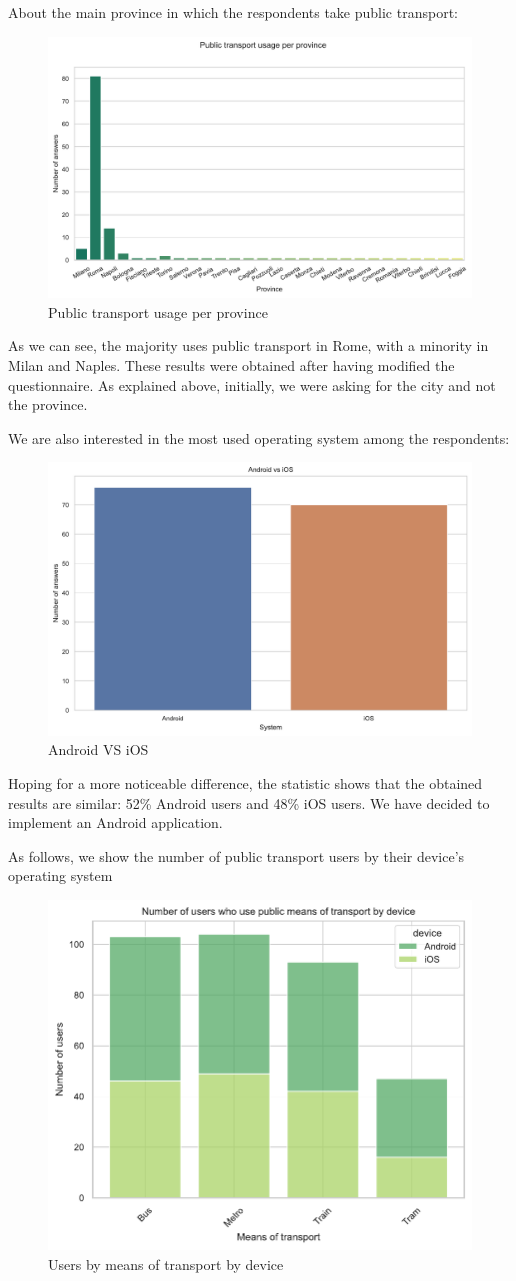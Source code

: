 \documentclass[a4paper, 11pt]{report}
\begin{document}
About the main province in which the respondents take public transport:
\begin{figure}[H]
	\centering
	\includegraphics[width=.8\textwidth]{img/analysis/public_transport_usage_per_province.pdf}
	\caption{Public transport usage per province}
\end{figure}
As we can see, the majority uses public transport in Rome, with a minority in Milan and Naples. These results were obtained after having modified
the questionnaire. As explained above, initially, we were asking for the city and not the province.

We are also interested in the most used operating system among the respondents:
\begin{figure}[H]
	\centering
	\includegraphics[width=.5\textwidth]{img/analysis/android_v_ios.pdf}
	\caption{Android VS iOS}
\end{figure}

Hoping for a more noticeable difference, the statistic shows that the obtained results are similar: 52\% Android users and 48\% iOS users.
We have decided to implement an Android application.

As follows, we show the number of public transport users by their device's operating system
\begin{figure}[H]
	\centering
	\includegraphics[width=.5\textwidth]{img/analysis/users_by_means_of_transport_by_device.pdf}
	\caption{Users by means of transport by device}
\end{figure}
\end{document}
